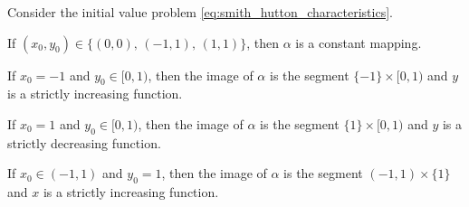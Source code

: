 \begin{prop} \label{prop:characteristics_1}
	Consider the initial value problem \eqref{eq:smith_hutton_characteristics}.
	\begin{enumerateprop}
		\item If $(x_0, y_0) \in \{ (0,0), \, (-1,1), \, (1,1) \}$, then
		$\alpha$ is a constant mapping.
		\item If $x_0 = -1$ and $y_0 \in [0, 1)$, then the image of $\alpha$ is
		the segment $\{ - 1 \} \times [0, 1)$ and $y$ is a
		strictly increasing function.
		\item If $x_0 = 1$ and  $y_0 \in [0,1)$, then the image of $\alpha$ is
		the segment $\{ 1 \} \times [0, 1)$ and $y$ is a strictly
		decreasing function.
		\item If $x_0 \in (-1,1)$ and $y_0 = 1$, then the image of $\alpha$ is
		the segment $(-1,1) \times \{ 1 \}$ and $x$ is a strictly increasing function.
	\end{enumerateprop}
\end{prop}
